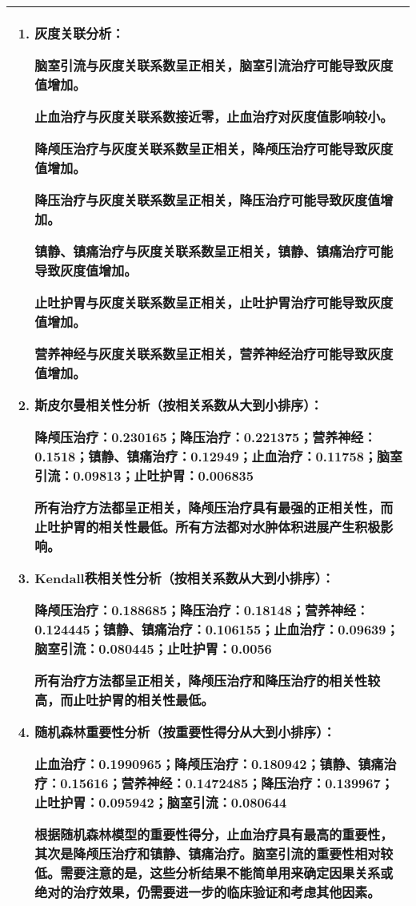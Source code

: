 \documentclass[bwprint]{gmcmthesis}
\begin{document}
				\begin{table}[H]
					\centering
					\begin{tabularx}{\textwidth}{|X|}
						\hline
						\begin{enumerate}
							\item 灰度关联分析：
							
							脑室引流与灰度关联系数呈正相关，脑室引流治疗可能导致灰度值增加。
							
							止血治疗与灰度关联系数接近零，止血治疗对灰度值影响较小。
							
							降颅压治疗与灰度关联系数呈正相关，降颅压治疗可能导致灰度值增加。
							
							降压治疗与灰度关联系数呈正相关，降压治疗可能导致灰度值增加。
							
							镇静、镇痛治疗与灰度关联系数呈正相关，镇静、镇痛治疗可能导致灰度值增加。
							
							止吐护胃与灰度关联系数呈正相关，止吐护胃治疗可能导致灰度值增加。
							
							营养神经与灰度关联系数呈正相关，营养神经治疗可能导致灰度值增加。
							
							\item 斯皮尔曼相关性分析（按相关系数从大到小排序）：
							
							降颅压治疗：0.230165；降压治疗：0.221375；营养神经：0.1518；镇静、镇痛治疗：0.12949；止血治疗：0.11758；脑室引流：0.09813；止吐护胃：0.006835
							
							所有治疗方法都呈正相关，降颅压治疗具有最强的正相关性，而止吐护胃的相关性最低。所有方法都对水肿体积进展产生积极影响。
							
							\item Kendall秩相关性分析（按相关系数从大到小排序）：
							
							降颅压治疗：0.188685；降压治疗：0.18148；营养神经：0.124445；镇静、镇痛治疗：0.106155；止血治疗：0.09639；脑室引流：0.080445；止吐护胃：0.0056
							
							所有治疗方法都呈正相关，降颅压治疗和降压治疗的相关性较高，而止吐护胃的相关性最低。
							
							\item 随机森林重要性分析（按重要性得分从大到小排序）：
							
							止血治疗：0.1990965；降颅压治疗：0.180942；镇静、镇痛治疗：0.15616；营养神经：0.1472485；降压治疗：0.139967；止吐护胃：0.095942；脑室引流：0.080644
							
							根据随机森林模型的重要性得分，止血治疗具有最高的重要性，其次是降颅压治疗和镇静、镇痛治疗。脑室引流的重要性相对较低。需要注意的是，这些分析结果不能简单用来确定因果关系或绝对的治疗效果，仍需要进一步的临床验证和考虑其他因素。
							
						\end{enumerate}\\
						\hline
					\end{tabularx}
				\end{table}
				
\end{document}
